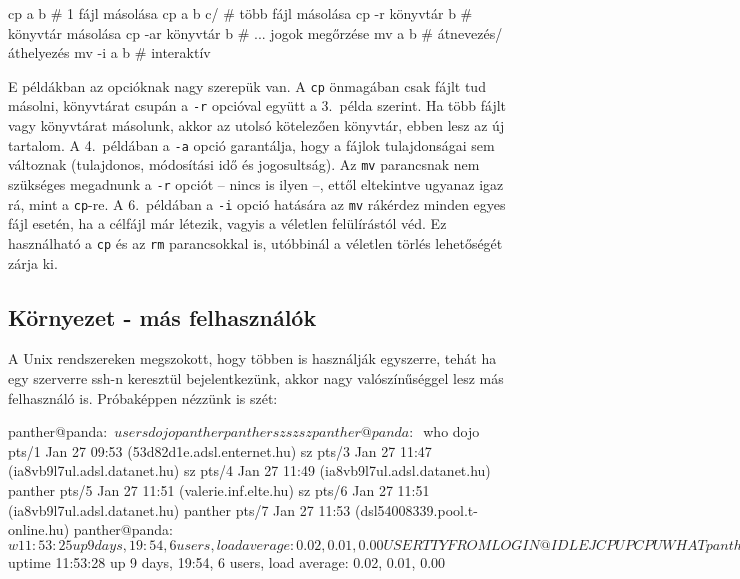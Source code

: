 \begin{VerbExampleNum}
cp a b             # 1 fájl másolása
cp a b c/          # több fájl másolása
cp -r könyvtár  b  # könyvtár másolása
cp -ar könyvtár b  # ... jogok megőrzése
mv a b             # átnevezés/áthelyezés
mv -i a b          # interaktív
\end{VerbExampleNum}

E példákban az opcióknak nagy szerepük van. A \texttt{cp} önmagában csak fájlt
tud másolni, könyvtárat csupán a \texttt{-r} opcióval együtt a 3.\ példa
szerint. Ha több fájlt vagy könyvtárat másolunk, akkor az utolsó kötelezően
könyvtár, ebben lesz az új tartalom. A 4.\ példában a \texttt{-a} opció
garantálja, hogy a fájlok tulajdonságai sem változnak (tulajdonos, módosítási
idő és jogosultság). Az \texttt{mv} parancsnak nem szükséges megadnunk a
\texttt{-r} opciót -- nincs is ilyen --, ettől eltekintve ugyanaz igaz rá, mint
a \texttt{cp}-re. A 6.\ példában a \texttt{-i} opció hatására az \texttt{mv}
rákérdez minden egyes fájl esetén, ha a célfájl már létezik, vagyis a véletlen
felülírástól véd. Ez használható a \texttt{cp} és az \texttt{rm} parancsokkal
is, utóbbinál a véletlen törlés lehetőségét zárja ki.


\subsection{Környezet - más felhasználók}

A Unix rendszereken megszokott, hogy többen is használják egyszerre, tehát ha
egy szerverre ssh-n keresztül bejelentkezünk, akkor nagy valószínűséggel lesz
más felhasználó is. Próbaképpen nézzünk is szét:

\begin{VerbExample}
panther@panda:~$ users
dojo panther panther sz sz sz
panther@panda:~$ who
dojo     pts/1        Jan 27 09:53 (53d82d1e.adsl.enternet.hu)
sz       pts/3        Jan 27 11:47 (ia8vb9l7ul.adsl.datanet.hu)
sz       pts/4        Jan 27 11:49 (ia8vb9l7ul.adsl.datanet.hu)
panther  pts/5        Jan 27 11:51 (valerie.inf.elte.hu)
sz       pts/6        Jan 27 11:51 (ia8vb9l7ul.adsl.datanet.hu)
panther  pts/7        Jan 27 11:53 (dsl54008339.pool.t-online.hu)
panther@panda:~$ w
 11:53:25 up 9 days, 19:54,  6 users,  load average: 0.02, 0.01, 0.00
USER     TTY      FROM              LOGIN@   IDLE   JCPU   PCPU WHAT
panther@panda:~$ uptime
 11:53:28 up 9 days, 19:54,  6 users,  load average: 0.02, 0.01, 0.00
\end{VerbExample}

